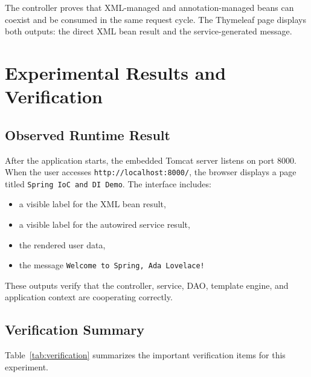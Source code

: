 \documentclass[12pt,a4paper]{article}
\begin{document}
The controller proves that XML-managed and annotation-managed beans can coexist and be consumed in the same request cycle. The Thymeleaf page displays both outputs: the direct XML bean result and the service-generated message.

\section{Experimental Results and Verification}

\subsection{Observed Runtime Result}
After the application starts, the embedded Tomcat server listens on port 8000. When the user accesses \texttt{http://localhost:8000/}, the browser displays a page titled \texttt{Spring IoC and DI Demo}. The interface includes:
\begin{itemize}
    \item a visible label for the XML bean result,
    \item a visible label for the autowired service result,
    \item the rendered user data,
    \item the message \texttt{Welcome to Spring, Ada Lovelace!}
\end{itemize}

These outputs verify that the controller, service, DAO, template engine, and application context are cooperating correctly.

\subsection{Verification Summary}
Table~\ref{tab:verification} summarizes the important verification items for this experiment.
\end{document}
